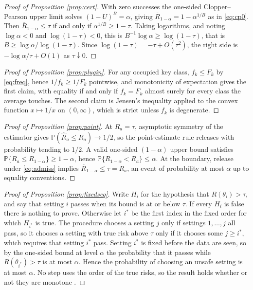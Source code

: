 \documentclass[11pt,a4paper]{article}
\theoremstyle{plain}
\theoremstyle{definition}
\theoremstyle{definition}
\theoremstyle{plain}
\newcommand{\Prob}{\mathbb{P}}
\begin{document}
\begin{proof}[Proof of Proposition \ref{prop:cert}]
With zero successes the one-sided Clopper--Pearson upper limit solves $(1 -
U)^B = \alpha$, giving $\overline{R}_{1-\alpha} = 1 - \alpha^{1/B}$ as in \eqref{eq:cp0}.
Then $\overline{R}_{1-\alpha} \leq \tau$ if and only if $\alpha^{1/B} \geq 1 - \tau$.
Taking logarithms, and noting $\log \alpha < 0$ and $\log(1-\tau) < 0$, this is
$B^{-1}\log\alpha \geq \log(1-\tau)$, that is $B \geq \log\alpha /
\log(1-\tau)$. Since $\log(1-\tau) = -\tau + O(\tau^2)$, the right side is
$-\log\alpha/\tau + O(1)$ as $\tau \downarrow 0$.
\end{proof}

\begin{proof}[Proof of Proposition \ref{prop:plugin}]
For any occupied key class, $f_k \leq F_k$ by \eqref{eq:freq}, hence $1/f_k
\geq 1/F_k$ pointwise, and monotonicity of expectation gives the first claim,
with equality if and only if $f_k = F_k$ almost surely for every class the
average touches. The second claim is Jensen's inequality applied to the convex
function $x \mapsto 1/x$ on $(0, \infty)$, which is strict unless $f_k$ is
degenerate.
\end{proof}

\begin{proof}[Proof of Proposition \ref{prop:point}]
At $R_a = \tau$, asymptotic symmetry of the estimator gives
$\Prob(\widehat{R}_a \leq R_a) \to 1/2$, so the point-estimate rule releases
with probability tending to $1/2$. A valid one-sided $(1-\alpha)$ upper bound
satisfies $\Prob\{R_a \leq \overline{R}_{1-\alpha}\} \geq 1 - \alpha$, hence
$\Prob\{\overline{R}_{1-\alpha} < R_a\} \leq \alpha$. At the boundary, release under
\eqref{eq:admiss} implies $\overline{R}_{1-\alpha} \leq \tau = R_a$, an event of
probability at most $\alpha$ up to equality conventions.
\end{proof}

\begin{proof}[Proof of Proposition \ref{prop:fixedseq}]
Write $H_i$ for the hypothesis that $R(\theta_i) > \tau$, and say that setting
$i$ passes when its bound is at or below $\tau$. If every $H_i$ is false there is
nothing to prove. Otherwise let $i^\ast$ be the first index in the fixed order for
which $H_{i^\ast}$ is true. The procedure chooses a setting $j$ only if settings
$1, \dots, j$ all pass, so it chooses a setting with true risk above $\tau$ only
if it chooses some $j \geq i^\ast$, which requires that setting $i^\ast$ pass.
Setting $i^\ast$ is fixed before the data are seen, so by the one-sided bound at
level $\alpha$ the probability that it passes while $R(\theta_{i^\ast}) > \tau$
is at most $\alpha$. Hence the probability of choosing an unsafe setting is at
most $\alpha$. No step uses the order of the true risks, so the result holds
whether or not they are monotone \citep{maurer1995}.
\end{proof}
\end{document}
